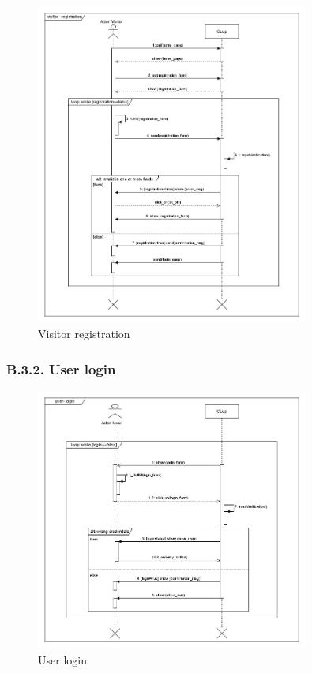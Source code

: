 \begin{figure}[H]
\centering
\includegraphics[width=0.8\textwidth]{sequence_diagrams/sequence_diagram_visitor_registration}
\caption{Visitor registration}
\end{figure}

\subsubsection{B.3.2. User login}

\begin{figure}[H]
\centering
\includegraphics[width=0.8\textwidth]{sequence_diagrams/sequence_diagram_user_login}
\caption{User login}
\end{figure}

